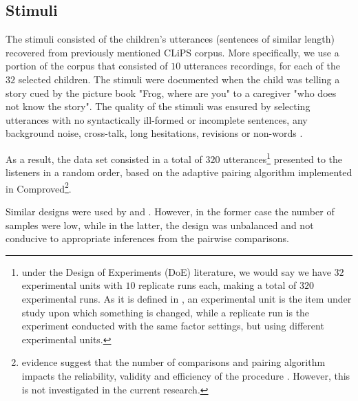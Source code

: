 \begin{comment}
	\textbf{for the experimenter:} Based on \citet{Faes_et_al_2021} we depict the procedure for the experimenter:
	\begin{enumerate}
		\item 1. matching procedure 
		\item selection of suitable stimuli
		\item determine the number of stimuli per judge 
		\item 
	\end{enumerate}	
\end{comment}
%
%
\subsection{Stimuli} \label{ss:stimuli}
%
The stimuli consisted of the children's utterances (sentences of similar length) recovered from previously mentioned CLiPS corpus. More specifically, we use a portion of the corpus that consisted of $10$ utterances recordings, for each of the $32$ selected children. The stimuli were documented when the child was telling a story cued by the picture book "Frog, where are you" \citep{Mayer_1969} to a caregiver "who does not know the story". The quality of the stimuli was ensured by selecting utterances with no syntactically ill-formed or incomplete sentences, any background noise, cross-talk, long hesitations, revisions or non-words \citep{Boonen_et_al_2021}. 

As a result, the data set consisted in a total of $320$ utterances\footnote{under the Design of Experiments (DoE) literature, we would say we have $32$ experimental units with $10$ replicate runs each, making a total of $320$ experimental runs. As it is defined in \citet{Lawson_2015}, an experimental unit is the item under study upon which something is changed, while a replicate run is the experiment conducted with the same factor settings, but using different experimental units.} presented to the listeners in a random order, based on the adaptive pairing algorithm \citep{Pollitt_2012b} implemented in Comproved\footnote{evidence suggest that the number of comparisons and pairing algorithm impacts the reliability, validity and efficiency of the procedure \citep{Bramley_2015, Bramley_et_al_2018, Lesterhuis_2018, Verhavert_et_al_2019}. However, this is not investigated in the current research.}.

Similar designs were used by \citet{Boonen_et_al_2020} and \citet{Faes_et_al_2021}. However, in the former case the number of samples were low, while in the latter, the design was unbalanced and not conducive to appropriate inferences from the pairwise comparisons.



